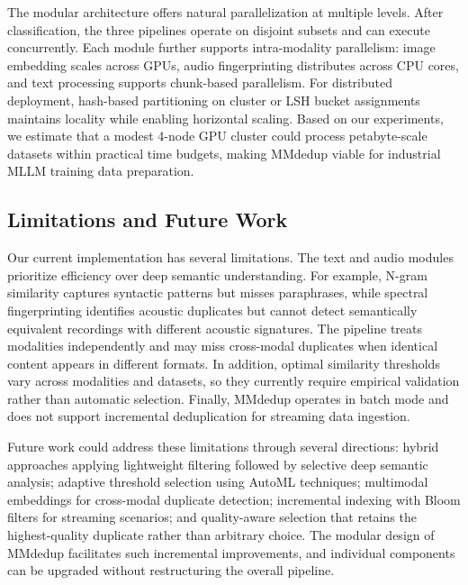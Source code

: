 \documentclass[sigconf, nonacm]{acmart}
\begin{document}
The modular architecture offers natural parallelization at multiple levels. After classification, the three pipelines operate on disjoint subsets and can execute concurrently. Each module further supports intra-modality parallelism: image embedding scales across GPUs, audio fingerprinting distributes across CPU cores, and text processing supports chunk-based parallelism. For distributed deployment, hash-based partitioning on cluster or LSH bucket assignments maintains locality while enabling horizontal scaling. Based on our experiments, we estimate that a modest 4-node GPU cluster could process petabyte-scale datasets within practical time budgets, making MMdedup viable for industrial MLLM training data preparation.

\subsection{Limitations and Future Work}
Our current implementation has several limitations. The text and audio modules prioritize efficiency over deep semantic understanding. For example, N-gram similarity captures syntactic patterns but misses paraphrases, while spectral fingerprinting identifies acoustic duplicates but cannot detect semantically equivalent recordings with different acoustic signatures. The pipeline treats modalities independently and may miss cross-modal duplicates when identical content appears in different formats. In addition, optimal similarity thresholds vary across modalities and datasets, so they currently require empirical validation rather than automatic selection. Finally, MMdedup operates in batch mode and does not support incremental deduplication for streaming data ingestion.

Future work could address these limitations through several directions: hybrid approaches applying lightweight filtering followed by selective deep semantic analysis; adaptive threshold selection using AutoML techniques; multimodal embeddings for cross-modal duplicate detection; incremental indexing with Bloom filters for streaming scenarios; and quality-aware selection that retains the highest-quality duplicate rather than arbitrary choice. The modular design of MMdedup facilitates such incremental improvements, and individual components can be upgraded without restructuring the overall pipeline.
\end{document}
